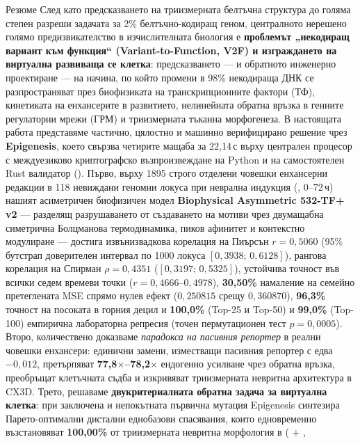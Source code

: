 \documentclass[10.5pt,a4paper]{article}
\begin{document}

\begin{abstractbox}{Резюме}
След като предсказването на триизмерната белтъчна структура до голяма степен разреши задачата за 2\% белтъчно-кодиращ геном, централното нерешено голямо предизвикателство в изчислителната биология е \textbf{проблемът „некодиращ вариант към функция“ (Variant-to-Function, V2F) и изграждането на виртуална развиваща се клетка}: предсказването — и обратното инженерно проектиране — на начина, по който промени в 98\% некодираща ДНК се разпространяват през биофизиката на транскрипционните фактори (ТФ), кинетиката на енхансерите в развитието, нелинейната обратна връзка в генните регулаторни мрежи (ГРМ) и триизмерната тъканна морфогенеза. В настоящата работа представяме частично, цялостно и машинно верифицирано решение чрез \textbf{Epigenesis}, което свързва четирите мащаба за 22,14\,с върху централен процесор с междуезиково криптографско възпроизвеждане на Python и на самостоятелен Rust валидатор (). Първо, върху 1895 строго отделени човешки енхансерни редакции в 118 невиждани геномни локуса при неврална индукция (, 0--72\,ч) нашият асиметричен биофизичен модел \textbf{Biophysical Asymmetric 532-TF+ v2} — разделящ разрушаването от създаването на мотиви чрез двумащабна симетрична Болцманова термодинамика, пиков афинитет и контекстно модулиране — достига извънизвадкова корелация на Пиърсън \textbf{$r=0{,}5060$} (95\% бутстрап доверителен интервал по 1000 локуса $[0{,}3938;\, 0{,}6128]$), рангова корелация на Спирман $\rho=0{,}4351$ ($[0{,}3197;\, 0{,}5325]$), устойчива точност във всички седем времеви точки ($r=0{,}4666$--$0{,}4978$), \textbf{30,50\%} намаление на семейно претеглената MSE спрямо нулев ефект ($0{,}250815$ срещу $0{,}360870$), \textbf{96,3\%} точност на посоката в горния децил и \textbf{100,0\%} (Top-25 и Top-50) и \textbf{99,0\%} (Top-100) емпирична лабораторна репресия (точен пермутационен тест $p=0{,}0005$). Второ, количествено доказваме \emph{парадокса на пасивния репортер} в реални човешки енхансери: единични замени, изместващи пасивния репортер с едва $-0{,}012$, претърпяват \textbf{77,8$\times$--78,2$\times$} ендогенно усилване чрез обратна връзка, преобръщат клетъчната съдба и изкривяват триизмерната невритна архитектура в CX3D. Трето, решаваме \textbf{двукритериалната обратна задача за виртуална клетка}: при заключена и непокътната първична мутация Epigenesis синтезира Парето-оптимални дистални еднобазови спасявания, които едновременно възстановяват \textbf{100,00\%} от триизмерната невритна морфология в  ( + , 
\end{abstractbox}
\end{document}
